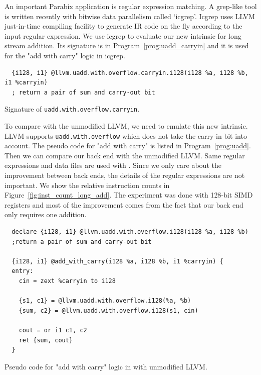 An important Parabix application is regular expression matching. A grep-like tool is written recently with bitwise data parallelism called `icgrep'. Icgrep uses LLVM just-in-time compiling facility to generate IR code on the fly according to the input regular expression. We use icgrep to evaluate our new intrinsic for long stream addition. Its signature is in Program~\ref{prog:uadd_carryin} and it is used for the "add with carry" logic in icgrep.

\begin{program}[htbp!]
\begin{verbatim}
  {i128, i1} @llvm.uadd.with.overflow.carryin.i128(i128 %a, i128 %b, i1 %carryin)
  ; return a pair of sum and carry-out bit
\end{verbatim}
\caption[Signature of {\tt uadd.with.overflow.carryin}]{Signature of {\tt uadd.with.overflow.carryin}.}
\label{prog:uadd_carryin}
\end{program}

To compare with the unmodified LLVM, we need to emulate this new intrinsic. LLVM supports {\tt uadd.with.overflow} which does not take the carry-in bit into account. The pseudo code for "add with carry" is listed in Program~\ref{prog:uadd}. Then we can compare our back end with the unmodified LLVM\@. Same regular expressions and data files are used with \cite{rob_regex}. Since we only care about the improvement between back ends, the details of the regular expressions are not important. We show the relative instruction counts in Figure~\ref{fig:inst_count_long_add}. The experiment was done with 128-bit SIMD registers and most of the improvement comes from the fact that our back end only requires one addition.

\begin{program}[htbp!]
\begin{verbatim}
  declare {i128, i1} @llvm.uadd.with.overflow.i128(i128 %a, i128 %b)
  ;return a pair of sum and carry-out bit

  {i128, i1} @add_with_carry(i128 %a, i128 %b, i1 %carryin) {
  entry:
    cin = zext %carryin to i128

    {s1, c1} = @llvm.uadd.with.overflow.i128(%a, %b)
    {sum, c2} = @llvm.uadd.with.overflow.i128(s1, cin)

    cout = or i1 c1, c2
    ret {sum, cout}
  }
\end{verbatim}
\caption[Pseudo code for "add with carry" logic in with unmodified LLVM]{Pseudo code for "add with carry" logic in with unmodified LLVM\@.}
\label{prog:uadd}
\end{program}

